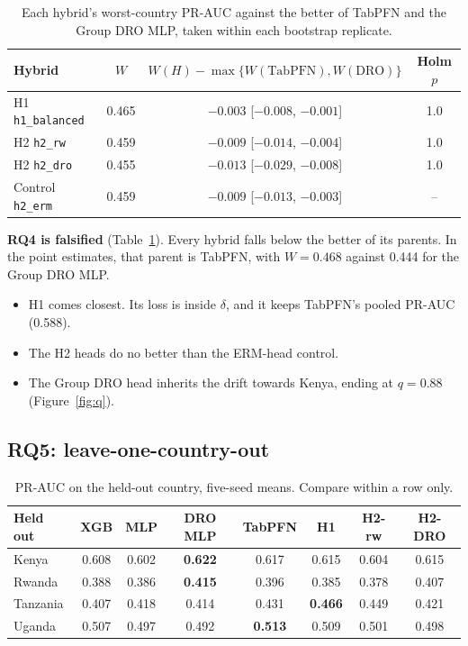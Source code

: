 \documentclass[11pt]{article}
\newcommand{\arm}[1]{\texttt{#1}}
\begin{document}
\begin{table}[H]
  \centering
  \small
  \caption{Each hybrid's worst-country PR-AUC against the better of TabPFN and the Group DRO MLP, taken within each bootstrap replicate.}
  \label{tab:e5}
  \begin{tabular}{lccc}
    \toprule
    Hybrid & $W$ & $W(H) - \max\{W(\text{TabPFN}), W(\text{DRO})\}$ & Holm $p$ \\
    \midrule
    H1 \arm{h1\_balanced}   & 0.465 & $-0.003$ [$-0.008$, $-0.001$] & 1.0 \\
    H2 \arm{h2\_rw}         & 0.459 & $-0.009$ [$-0.014$, $-0.004$] & 1.0 \\
    H2 \arm{h2\_dro}        & 0.455 & $-0.013$ [$-0.029$, $-0.008$] & 1.0 \\
    Control \arm{h2\_erm}   & 0.459 & $-0.009$ [$-0.013$, $-0.003$] & -- \\
    \bottomrule
  \end{tabular}
\end{table}

\textbf{RQ4 is falsified} (Table~\ref{tab:e5}). Every hybrid falls below the better of its parents. In the point estimates, that parent is TabPFN, with $W = 0.468$ against 0.444 for the Group DRO MLP.
\begin{itemize}
  \item H1 comes closest. Its loss is inside $\delta$, and it keeps TabPFN's pooled PR-AUC (0.588).
  \item The H2 heads do no better than the ERM-head control.
  \item The Group DRO head inherits the drift towards Kenya, ending at $q = 0.88$ (Figure~\ref{fig:q}).
\end{itemize}

\subsection{RQ5: leave-one-country-out}

\begin{table}[H]
  \centering
  \small
  \caption{PR-AUC on the held-out country, five-seed means. Compare within a row only.}
  \label{tab:e4}
  \begin{tabular}{lccccccc}
    \toprule
    Held out & XGB & MLP & DRO MLP & TabPFN & H1 & H2-rw & H2-DRO \\
    \midrule
    Kenya    & 0.608 & 0.602 & \textbf{0.622} & 0.617 & 0.615 & 0.604 & 0.615 \\
    Rwanda   & 0.388 & 0.386 & \textbf{0.415} & 0.396 & 0.385 & 0.378 & 0.407 \\
    Tanzania & 0.407 & 0.418 & 0.414 & 0.431 & \textbf{0.466} & 0.449 & 0.421 \\
    Uganda   & 0.507 & 0.497 & 0.492 & \textbf{0.513} & 0.509 & 0.501 & 0.498 \\
    \bottomrule
  \end{tabular}
\end{table}
\end{document}
